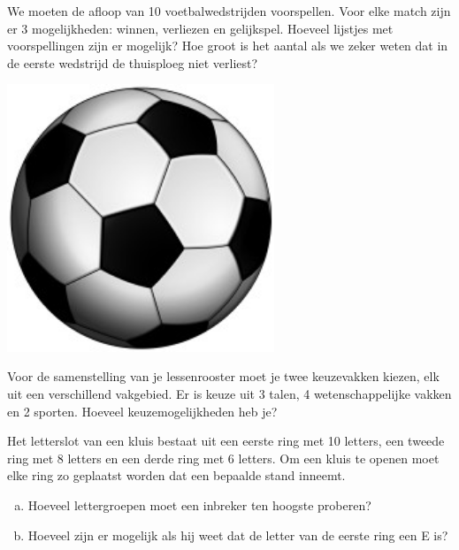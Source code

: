 \documentclass[12pt,twoside]{article}
\begin{document}
\begin{minipage}{0.7\textwidth}
\begin{oefening}
We moeten de afloop van 10 voetbalwedstrijden voorspellen. Voor elke match zijn er 3 mogelijkheden: winnen, verliezen en gelijkspel. Hoeveel lijstjes met voorspellingen zijn er mogelijk? Hoe groot is het aantal als we zeker weten dat in de eerste wedstrijd de thuisploeg niet verliest?
\end{oefening}
\end{minipage}
\begin{minipage}{0.25\textwidth}
\hfill
  \includegraphics[width=0.6\textwidth]{voetbal}
\end{minipage}

\begin{oefening}
Voor de samenstelling van je lessenrooster moet je twee keuzevakken kiezen, elk uit een verschillend vakgebied. Er is keuze uit 3 talen, 4 wetenschappelijke vakken en 2 sporten. Hoeveel keuzemogelijkheden heb je?
\end{oefening}

\begin{oefening}
Het letterslot van een kluis bestaat uit een eerste ring met 10 letters, een tweede ring met 8 letters en een derde ring met 6 letters. Om een kluis te openen moet elke ring zo geplaatst worden dat een bepaalde stand inneemt.
\begin{enumerate}[(a)]
  \item Hoeveel lettergroepen moet een inbreker ten hoogste proberen?
  \item Hoeveel zijn er mogelijk als hij weet dat de letter van de eerste ring een E is?
\end{enumerate}
\end{oefening}
\end{document}
